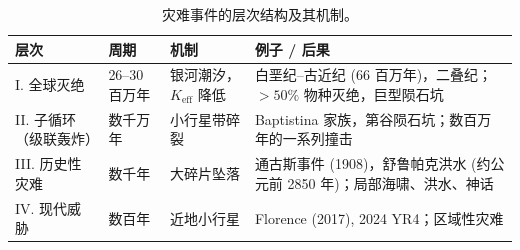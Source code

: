\documentclass[11pt,a4paper]{article}
\begin{document}
	\begin{table}[!ht]
		\centering
		\caption{灾难事件的层次结构及其机制。}
		\label{tab:hierarchy}
		\scriptsize
		\begin{tabular}{p{3.5cm}p{2.4cm}p{3.4cm}p{7.5cm}}
			\toprule
			\textbf{层次} & \textbf{周期} & \textbf{机制} & \textbf{例子 / 后果} \\
			\midrule
			I. 全球灭绝 & 26–30 百万年 & 银河潮汐，\(K_{\mathrm{eff}}\) 降低 & 白垩纪–古近纪 (66 百万年)，二叠纪；\(>50\%\) 物种灭绝，巨型陨石坑 \\
			II. 子循环（级联轰炸） & 数千万年 & 小行星带碎裂 & Baptistina 家族，第谷陨石坑；数百万年的一系列撞击 \\
			III. 历史性灾难 & 数千年 & 大碎片坠落 & 通古斯事件 (1908)，舒鲁帕克洪水 (约公元前 2850 年)；局部海啸、洪水、神话 \\
			IV. 现代威胁 & 数百年 & 近地小行星 & Florence (2017), 2024 YR4；区域性灾难 \\
			\bottomrule
		\end{tabular}
	\end{table}
	
\end{document}
